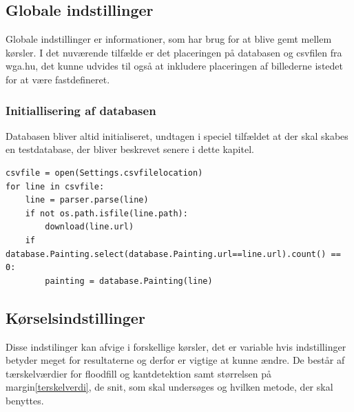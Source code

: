 {\subsection{Globale indstillinger}
Globale indstillinger er informationer, som har brug for at blive gemt
mellem kørsler. I det nuværende tilfælde er det placeringen på databasen og
csvfilen fra wga.hu, det kunne udvides til også at inkludere placeringen
af billederne istedet for at være fastdefineret.
\subsubsection{Initiallisering af databasen}
Databasen bliver altid initialiseret, undtagen i speciel tilfældet at
der skal skabes en testdatabase, der bliver beskrevet senere i dette
kapitel. 
\begin{lstlisting}[caption={Pseudokode for database
initialisering},frame=tb,label={pseudo_init_db}]
csvfile = open(Settings.csvfilelocation)
for line in csvfile:
	line = parser.parse(line)
	if not os.path.isfile(line.path):
		download(line.url)
	if database.Painting.select(database.Painting.url==line.url).count() == 0:
		painting = database.Painting(line)
\end{lstlisting}

\subsection{Kørselsindstillinger}
Disse indstilinger kan afvige i forskellige kørsler, det er variable
hvis indstillinger betyder meget for resultaterne og derfor er vigtige
at kunne ændre. De består af tærskelværdier for floodfill og
kantdetektion samt størrelsen på margin\ref{terskelverdi}, de snit, som
skal undersøges og hvilken metode, der skal benyttes.
}
